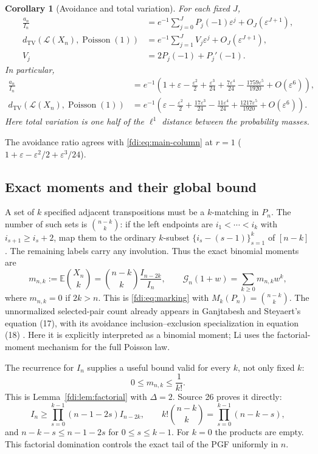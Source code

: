 \documentclass[11pt,letterpaper]{article}
\newtheorem{corollary}[theorem]{Corollary}
\theoremstyle{remark}\newtheorem{remark}[theorem]{Remark}
\newcommand{\E}{\mathbb E}\newcommand{\Prb}{\mathbb P}\newcommand{\R}{\mathbb R}\newcommand{\C}{\mathbb C}
\newcommand{\eps}{\varepsilon}\newcommand{\Pois}{\operatorname{Poisson}}
\newcommand{\TV}{d_{\mathrm{TV}}}
\begin{document}
\begin{corollary}[Avoidance and total variation]\label{fdi:adj:cor:tv}
For each fixed $J$,
\begin{align}
 \frac{a_n}{I_n}&=e^{-1}\sum_{j=0}^J P_j(-1)\eps^j+O_J(\eps^{J+1}),\label{fdi:adj:eq:avoidratio}\\
 \TV(\mathcal L(X_n),\Pois(1))
 &=e^{-1}\sum_{j=1}^J V_j\eps^j+O_J(\eps^{J+1}),\label{fdi:adj:eq:tv}\\
 V_j&=2P_j(-1)+P_j'(-1).\nonumber
\end{align}
In particular,
\begin{align*}
 \frac{a_n}{I_n}
 &=e^{-1}\left(1+\eps-\frac{\eps^2}{2}+\frac{\eps^3}{24}
       +\frac{7\eps^4}{24}-\frac{1759\eps^5}{1920}+O(\eps^6)\right),\\
 \TV(\mathcal L(X_n),\Pois(1))
 &=e^{-1}\left(\eps-\frac{\eps^2}{2}+\frac{17\eps^3}{24}
       -\frac{11\eps^4}{24}+\frac{1217\eps^5}{1920}+O(\eps^6)\right).
\end{align*}
Here total variation is one half of the $\ell^1$ distance between the probability masses.
\end{corollary}
The avoidance ratio agrees with \eqref{fdi:eq:main-column} at $r=1$ ($1+\eps-\eps^2/2+\eps^3/24$).

\subsection{Exact moments and their global bound}
A set of $k$ specified adjacent transpositions must be a $k$-matching in $P_n$. The number of such sets is $\binom{n-k}{k}$: if the left endpoints are $i_1<\cdots<i_k$ with $i_{s+1}\ge i_s+2$, map them to the ordinary $k$-subset $\{i_s-(s-1)\}_{s=1}^k$ of $[n-k]$. The remaining labels carry any involution. Thus the exact binomial moments are
\begin{equation}\label{fdi:adj:eq:moments}
 m_{n,k}:=\E\binom{X_n}{k}
   =\binom{n-k}{k}\frac{I_{n-2k}}{I_n},\qquad
 \mathcal G_n(1+w)=\sum_{k\ge0}m_{n,k}w^k,
\end{equation}
where $m_{n,k}=0$ if $2k>n$. This is \eqref{fdi:eq:marking} with $M_k(P_n)=\binom{n-k}k$. The unnormalized selected-pair count already appears in Ganjtabesh and Steyaert's equation (17), with its avoidance inclusion--exclusion specialization in equation (18) \cite{ganjtabesh}. Here it is explicitly interpreted as a binomial moment; Li uses the factorial-moment mechanism for the full Poisson law.

The recurrence for $I_n$ supplies a useful bound valid for every $k$, not only fixed $k$:
\begin{equation}\label{fdi:adj:eq:domination}
 0\le m_{n,k}\le\frac1{k!}.
\end{equation}
This is Lemma~\ref{fdi:lem:factorial} with $\Delta=2$. Source 26 proves it directly:
\[
 I_n\ge\prod_{s=0}^{k-1}(n-1-2s)I_{n-2k},\qquad
 k!\binom{n-k}{k}=\prod_{s=0}^{k-1}(n-k-s),
\]
and $n-k-s\le n-1-2s$ for $0\le s\le k-1$. For $k=0$ the products are empty. This factorial domination controls the exact tail of the PGF uniformly in $n$.
\end{document}
